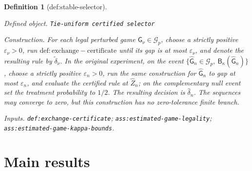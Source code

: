 \documentclass{article}
\newtheorem{definition}{Definition}
\begin{document}
\begin{definition}[def:stable-selector]\label{def:stable-selector}
\par\smallskip\noindent\emph{Defined object.} \texttt{Tie-\allowbreak{}uniform certified selector}
\par\smallskip\noindent\emph{Construction.} For each legal perturbed game \(\mathsf G_{\nu}\in\mathcal G_p\), choose a strictly positive \(\varepsilon_{\nu}>0\), run \(\mathrm{def:exchange-certificate}\) until its gap is at most \(\varepsilon_{\nu}\), and denote the resulting rule by \(\widetilde\delta_{\nu}\). In the original experiment, on the event \(\{\widehat{\mathsf G}_n\in\mathcal G_p,\ \mathsf B_{\kappa}(\widehat{\mathsf G}_n)\}\), choose a strictly positive \(\varepsilon_n>0\), run the same construction for \(\widehat{\mathsf G}_n\) to gap at most \(\varepsilon_n\), and evaluate the certified rule at \(\widehat Z_n\); on the complementary null event set the treatment probability to \(1/2\). The resulting decision is \(\widehat\delta_n\). The sequences may converge to zero, but this construction has no zero-tolerance finite branch.
\par\smallskip\noindent\emph{Inputs.} \texttt{def:\allowbreak{}exchange-\allowbreak{}certificate}; \texttt{ass:\allowbreak{}estimated-\allowbreak{}game-\allowbreak{}legality}; \texttt{ass:\allowbreak{}estimated-\allowbreak{}game-\allowbreak{}kappa-\allowbreak{}bounds}.
\end{definition}

\section{Main results}
\end{document}
